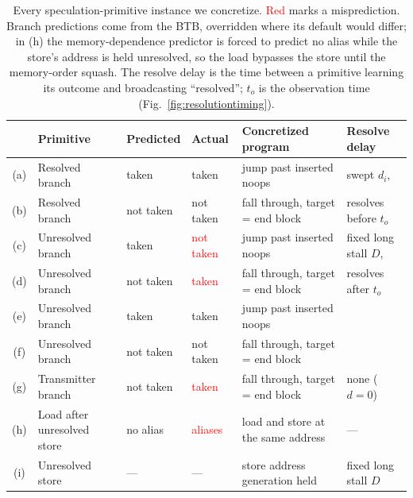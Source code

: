 \begin{table}[t]
  \centering
  \small
  \renewcommand{\arraystretch}{1.15}
  \begin{tabular}{@{}c l l l l l@{}}
    \toprule
    & \textbf{Primitive} & \textbf{Predicted} & \textbf{Actual} & \textbf{Concretized program} & \textbf{Resolve delay} \\
    \midrule
    (a) & Resolved branch   & taken     & taken     & jump past inserted noops           & swept $d_i$, \\ %
    (b) & Resolved branch   & not taken & not taken & fall through, target = end block   & resolves before $t_o$ \\
    \midrule
    (c) & Unresolved branch & taken     & \textcolor{red}{not taken} & jump past inserted noops & fixed long stall $D$, \\
    (d) & Unresolved branch & not taken & \textcolor{red}{taken}     & fall through, target = end block & resolves after $t_o$ \\
    (e) & Unresolved branch & taken     & taken     & jump past inserted noops           & \\ %
    (f) & Unresolved branch & not taken & not taken & fall through, target = end block   & \\ %
    \midrule
    (g) & Transmitter branch & not taken & \textcolor{red}{taken} & fall through, target = end block & none ($d = 0$) \\
    \midrule
    (h) & Load after unresolved store & no alias & \textcolor{red}{aliases} & load and store at the same address & --- \\ %
    (i) & Unresolved store  & ---       & ---       & store address generation held      & fixed long stall $D$ \\
    \bottomrule
  \end{tabular}
  \caption{Every speculation-primitive instance we concretize. \textcolor{red}{Red} marks a misprediction. Branch predictions come from the BTB, overridden where its default would differ; in (h) the memory-dependence predictor is forced to predict no alias while the store's address is held unresolved, so the load bypasses the store until the memory-order squash. The resolve delay is the time between a primitive learning its outcome and broadcasting ``resolved''; $t_o$ is the observation time (Fig.~\ref{fig:resolutiontiming}).}
  \label{tab:sptable}
\end{table}
